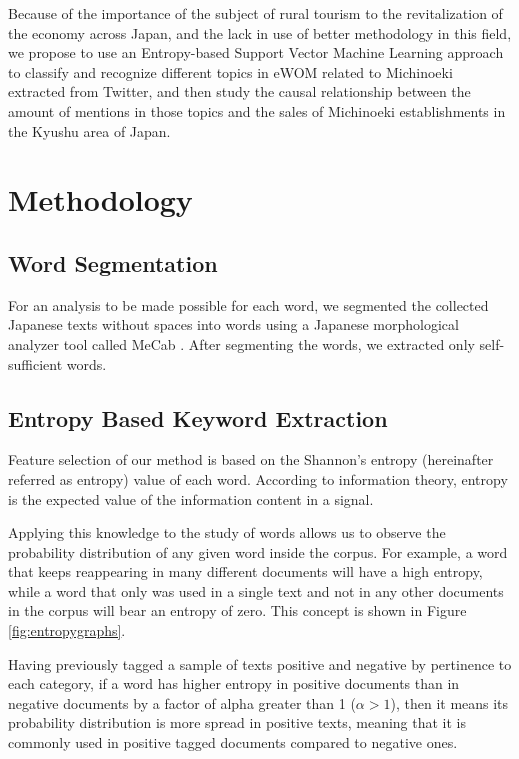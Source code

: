 \documentclass[review]{elsarticle}
\begin{document}
Because of the importance of the subject of rural tourism to the revitalization of the economy across Japan, and the lack in use of better methodology in this field, we propose to use an Entropy-based Support Vector Machine Learning approach to classify and recognize different topics in eWOM related to Michinoeki extracted from Twitter, and then study the causal relationship between the amount of mentions in those topics and the sales of Michinoeki establishments in the Kyushu area of Japan.

\section{Methodology}\label{methodology}

\subsection{Word Segmentation}\label{segment}

For an analysis to be made possible for each word, we segmented the collected Japanese texts without spaces into words using a Japanese morphological analyzer tool called MeCab \cite[][]{kudo2004}. After segmenting the words, we extracted only self-sufficient words.

\subsection{Entropy Based Keyword Extraction}\label{entropy}

Feature selection of our method is based on the Shannon’s entropy (hereinafter referred as entropy) value \cite[][]{shannon1948} of each word. According to information theory, entropy is the expected value of the information content in a signal.

Applying this knowledge to the study of words allows us to observe the probability distribution of any given word inside the corpus. For example, a word that keeps reappearing in many different documents will have a high entropy, while a word that only was used in a single text and not in any other documents in the corpus will bear an entropy of zero. This concept is shown in Figure \ref{fig:entropygraphs}.

Having previously tagged a sample of texts positive and negative by pertinence to each category, if a word has higher entropy in positive documents than in negative documents by a factor of alpha greater than 1 (\(\alpha > 1\)), then it means its probability distribution is more spread in positive texts, meaning that it is commonly used in positive tagged documents compared to negative ones.
\end{document}
